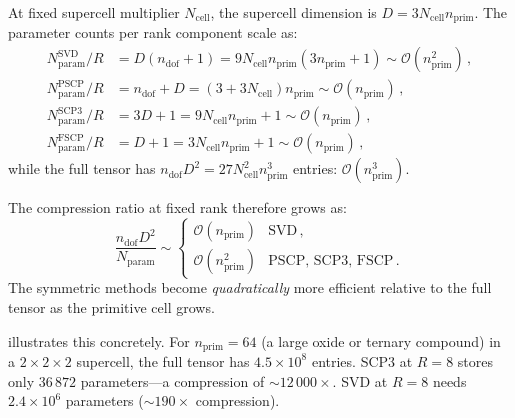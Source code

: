 \documentclass[11pt]{article}
\newcommand{\ndof}{n_{\mathrm{dof}}}
\newcommand{\nprim}{n_{\mathrm{prim}}}
\newcommand{\cO}{\mathcal{O}}
\begin{document}
At fixed supercell multiplier $N_{\mathrm{cell}}$, the supercell
dimension is $D = 3 N_{\mathrm{cell}} \nprim$.  The parameter counts
per rank component scale as:
\begin{align}
  N_{\mathrm{param}}^{\mathrm{SVD}} / R
    &= D(\ndof + 1)
    = 9 N_{\mathrm{cell}} \nprim (3\nprim + 1)
    \sim \cO(\nprim^2)\,,  \\
  N_{\mathrm{param}}^{\mathrm{PSCP}} / R
    &= \ndof + D
    = (3 + 3 N_{\mathrm{cell}}) \nprim
    \sim \cO(\nprim)\,,  \\
  N_{\mathrm{param}}^{\mathrm{SCP3}} / R
    &= 3D + 1
    = 9 N_{\mathrm{cell}} \nprim + 1
    \sim \cO(\nprim)\,,  \\
  N_{\mathrm{param}}^{\mathrm{FSCP}} / R
    &= D + 1
    = 3 N_{\mathrm{cell}} \nprim + 1
    \sim \cO(\nprim)\,,
\end{align}
while the full tensor has $\ndof D^2 = 27 N_{\mathrm{cell}}^2 \nprim^3$
entries: $\cO(\nprim^3)$.

The compression ratio at fixed rank therefore grows as:
\begin{equation}
  \frac{\ndof D^2}{N_{\mathrm{param}}}
  \sim
  \begin{cases}
    \cO(\nprim)   & \text{SVD}\,,\\
    \cO(\nprim^2) & \text{PSCP, SCP3, FSCP}\,.
  \end{cases}
\end{equation}
The symmetric methods become \emph{quadratically} more efficient
relative to the full tensor as the primitive cell grows.

 illustrates this concretely.  For $\nprim = 64$
(a large oxide or ternary compound) in a $2\times2\times2$ supercell,
the full tensor has $4.5 \times 10^8$ entries.  SCP3 at $R=8$ stores
only $36\,872$ parameters---a compression of ${\sim}12\,000\times$.
SVD at $R=8$ needs $2.4 \times 10^6$ parameters
(${\sim}190\times$ compression).
\end{document}
